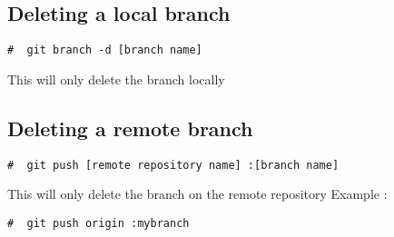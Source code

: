 \documentclass{article}
\begin{document}
\subsection{Deleting a local branch}
\begin{lstlisting}[style=BashInputStyle]
    #  git branch -d [branch name]
\end{lstlisting}
This will only delete the branch locally

\subsection{Deleting a remote branch}
\begin{lstlisting}[style=BashInputStyle]
    #  git push [remote repository name] :[branch name]
\end{lstlisting}
This will only delete the branch on the remote repository
Example :
\begin{lstlisting}[style=BashInputStyle]
    #  git push origin :mybranch
\end{lstlisting}
\end{document}
